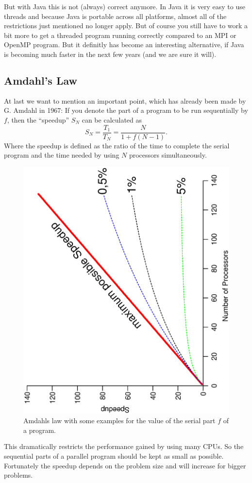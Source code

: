 But with Java this is
not (always) correct anymore. In Java it is very easy to use threads and
because Java is portable across all platforms, almost all of 
the restrictions just mentioned no longer apply. 
But of course you still have to work a bit more to get a threaded
program running correctly compared to an MPI or OpenMP program. But it 
definitly has become an interesting alternative, if Java is becoming much
faster in the next few years (and we are sure it will).

\subsection{Amdahl's Law}
At last we want to mention an important point, which has already been made 
by G. Amdahl in 1967: If you denote the part of a program to be run
sequentially by $f$, then the ``speedup'' $S_N$ can be calculated as
$$ S_N =\frac{T_1}{T_N} = \frac{N}{1+f(N-1)} .$$
Where the speedup is defined as the ratio of the time to complete 
the serial program and the time needed by using $N$ processors simultaneously. 
\begin{figure}[htbp]
  \begin{center}
    \includegraphics[angle=-90,width=\textwidth]{Figures/Amdahl.eps}
    \caption{Amdahls law with some examples for the value of the serial
      part $f$ of a program.}
    \label{fig:Amdahl}
  \end{center}
\end{figure}
This dramatically restricts the performance gained by using many CPUs.
So the sequential parts of a parallel program should be kept as small
as possible. Fortunately the speedup depends on the problem size and
will increase for bigger problems. 

